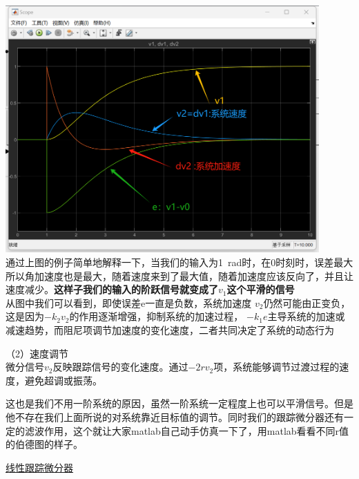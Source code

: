 \documentclass[UTF8,a4paper,12pt]{ctexart}
\begin{document}
              \par \includegraphics[width=12cm]{picture/tracking_differentiator_scope.png}\\
              通过上图的例子简单地解释一下，当我们的输入为1\ rad时，在0时刻时，误差最大所以角加速度也是最大，随着速度来到了最大值，随着加速度应该反向了，并且让速度减少。\textbf{这样子我们的输入的阶跃信号就变成了$v_1$这个平滑的信号}\\
              从图中我们可以看到，即使误差e一直是负数，系统加速度 $v_2$仍然可能由正变负，这是因为$-k_2v_2$的作用逐渐增强，抑制系统的加速过程， $-k_1e$主导系统的加速或减速趋势，而阻尼项调节加速度的变化速度，二者共同决定了系统的动态行为\\
              \begin{flushleft}
                （2）速度调节\\
              微分信号$v_2$反映跟踪信号的变化速度。通过$-2rv_2$项，系统能够调节过渡过程的速度，避免超调或振荡。\\
              \begin{flushleft}
                这也是我们不用一阶系统的原因，虽然一阶系统一定程度上也可以平滑信号。但是他不存在我们上面所说的对系统靠近目标值的调节。同时我们的跟踪微分器还有一定的滤波作用，这个就让大家matlab自己动手仿真一下了，用matlab看看不同r值的伯德图的样子。

              \end{flushleft}

              \end{flushleft}
              

          \href{https://blog.csdn.net/weiequest_misc=&request_id=&biz_id=102&utm_term=%E8%B7%9F%E8%B8%AA%E5%BE%AE%E5%88%86%E5%99%A8&utm_medium=distribute.pc_search_result.none-task-blog-2~all~sobaiduweb~default-3-124520209.142^v101^pc_search_result_base1&spm=1018.2226.3001.4187}{线性跟踪微分器}
\end{document}
